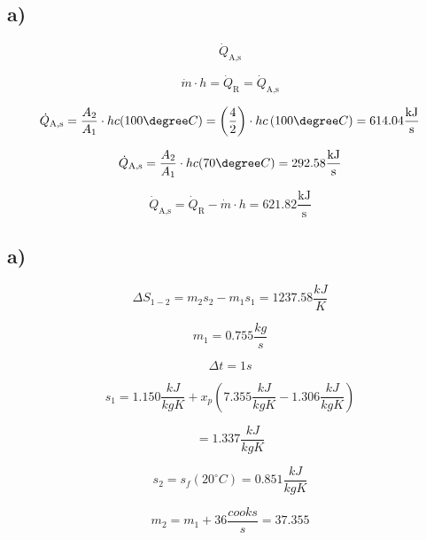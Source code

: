 

\subsection*{a)}

\[
\dot{Q}_{\text{A,s}}
\]

\[
\dot{m} \cdot h = \dot{Q}_{\text{R}} = \dot{Q}_{\text{A,s}}
\]

\[
\dot{Q}_{\text{A,s}} = \frac{A_2}{A_1} \cdot h c (100 \degree C) = \left( \frac{4}{2} \right) \cdot h c \left( 100 \degree C \right) = 614.04 \frac{\text{kJ}}{\text{s}}
\]

\[
\dot{Q}_{\text{A,s}} = \frac{A_2}{A_1} \cdot h c (70 \degree C) = 292.58 \frac{\text{kJ}}{\text{s}}
\]

\[
\dot{Q}_{\text{A,s}} = \dot{Q}_{\text{R}} - \dot{m} \cdot h = 621.82 \frac{\text{kJ}}{\text{s}}
\]



\subsection*{a)}

\[
\Delta S_{1-2} = m_2 s_2 - m_1 s_1 = 1237.58 \frac{kJ}{K}
\]

\[
m_1 = 0.755 \frac{kg}{s}
\]

\[
\Delta t = 1 s
\]

\[
s_1 = 1.150 \frac{kJ}{kgK} + x_p (7.355 \frac{kJ}{kgK} - 1.306 \frac{kJ}{kgK})
\]

\[
= 1.337 \frac{kJ}{kgK}
\]

\[
s_2 = s_f (20^\circ C) = 0.851 \frac{kJ}{kgK}
\]

\[
m_2 = m_1 + 36 \frac{cooks}{s} = 37.355
\]